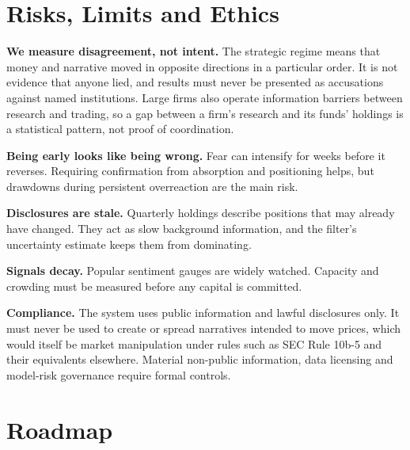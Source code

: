 \documentclass[11pt,a4paper]{article}
\theoremstyle{plain}
\theoremstyle{definition}
\begin{document}
\section{Risks, Limits and Ethics}\label{sec:risks}

\textbf{We measure disagreement, not intent.} The strategic regime means that money and narrative moved in opposite directions in a particular order. It is not evidence that anyone lied, and results must never be presented as accusations against named institutions. Large firms also operate information barriers between research and trading, so a gap between a firm's research and its funds' holdings is a statistical pattern, not proof of coordination.

\textbf{Being early looks like being wrong.} Fear can intensify for weeks before it reverses. Requiring confirmation from absorption and positioning helps, but drawdowns during persistent overreaction are the main risk.

\textbf{Disclosures are stale.} Quarterly holdings describe positions that may already have changed. They act as slow background information, and the filter's uncertainty estimate keeps them from dominating.

\textbf{Signals decay.} Popular sentiment gauges are widely watched. Capacity and crowding must be measured before any capital is committed.

\textbf{Compliance.} The system uses public information and lawful disclosures only. It must never be used to create or spread narratives intended to move prices, which would itself be market manipulation under rules such as SEC Rule 10b-5 and their equivalents elsewhere. Material non-public information, data licensing and model-risk governance require formal controls.

\section{Roadmap}\label{sec:roadmap}
\end{document}

